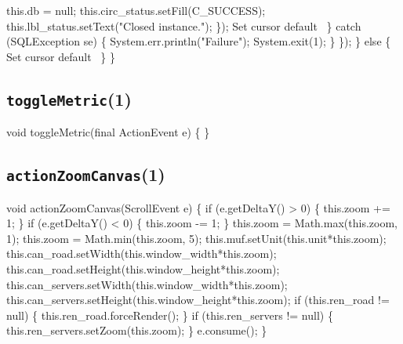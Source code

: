           this.db = null;
          this.circ_status.setFill(C_SUCCESS);
          this.lbl_status.setText("Closed instance.");
        \});
        \LA{}Set cursor default~{\nwtagstyle{}}\RA{}
      \} catch (SQLException se) \{
        System.err.println("Failure");
        System.exit(1);
      \}
    \});
  \} else \{
    \LA{}Set cursor default~{\nwtagstyle{}}\RA{}
  \}
\}
\eatline
{}\nwendcode{}\nwdocspar
\subsection{\texttt{toggleMetric}(1)}
\nwenddocs{}\endmoddef{}
void toggleMetric(final ActionEvent e) \{
\}
\eatline
{}\nwendcode{}\nwdocspar
\subsection{\texttt{actionZoomCanvas}(1)}
\nwenddocs{}\endmoddef{}
void actionZoomCanvas(ScrollEvent e) \{
  if (e.getDeltaY() > 0) \{
    this.zoom += 1;
  \}
  if (e.getDeltaY() < 0) \{
    this.zoom -= 1;
  \}
  this.zoom = Math.max(this.zoom, 1);
  this.zoom = Math.min(this.zoom, 5);
  this.muf.setUnit(this.unit*this.zoom);
  this.can_road.setWidth(this.window_width*this.zoom);
  this.can_road.setHeight(this.window_height*this.zoom);
  this.can_servers.setWidth(this.window_width*this.zoom);
  this.can_servers.setHeight(this.window_height*this.zoom);
  if (this.ren_road != null) \{
    this.ren_road.forceRender();
  \}
  if (this.ren_servers != null) \{
    this.ren_servers.setZoom(this.zoom);
  \}
  e.consume();
\}
\eatline
{}\nwendcode{}\nwdocspar
